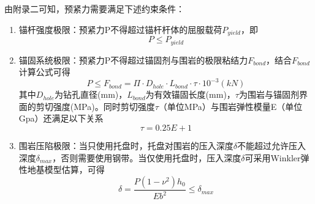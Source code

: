 \documentclass[UTF-8,a4paper,zihao=-4]{ctexart}
\begin{document}
由附录二可知，预紧力需要满足下述约束条件：
\begin{enumerate}
    \item 锚杆强度极限：预紧力P不得超过锚杆杆体的屈服载荷$P_{yield}$，即
    \begin{equation}
        P\le P_{yield}
    \end{equation}
    \item 锚固系统极限：预紧力P不得超过锚固剂与围岩的极限粘结力$F_{bond}$，结合$F_{bond}$计算公式可得
    \begin{equation}
        P\le F_{bond}=\Pi \cdot D_{hole} \cdot L_{bond} \cdot \tau \cdot 10^{-3}(kN)
    \label{q4-lim2-raw1}
    \end{equation}
    其中$D_{hole}$为钻孔直径(mm)，$L_{bond}$为有效锚固长度(mm)，$\tau$为围岩与锚固剂界面的剪切强度(MPa)。同时剪切强度$\tau$（单位MPa）与围岩弹性模量E（单位Gpa）还满足以下关系
    \begin{equation}
        \tau=0.25E+1
    \label{q4-lim2-raw2}
    \end{equation}
    \item 围岩压陷极限：当只使用托盘时，托盘对围岩的压入深度$\delta$不能超过允许压入深度$\delta_{max}$，否则需要使用钢带。当仅使用托盘时，压入深度$\delta$可采用Winkler弹性地基模型估算，可得
    \begin{equation}
        \delta=\frac{P(1-\nu^2)h_0}{Eb^2}\le \delta_{max}
    \label{q4-lim3-raw}
    \end{equation}
\end{enumerate}
 
\end{document}
